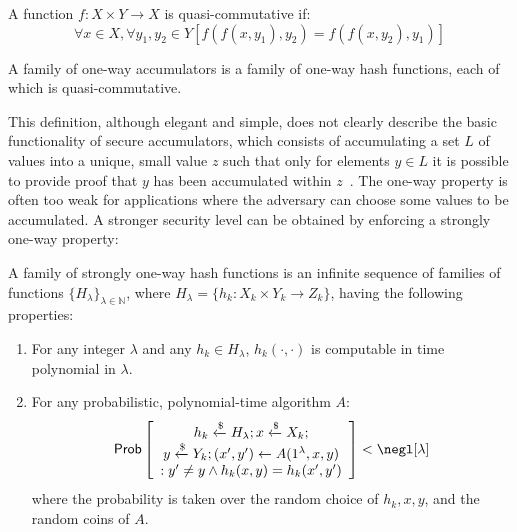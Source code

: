 \documentclass{iacrcc}
\begin{document}
\begin{definition}
A function \(f : X \times Y \to X\) is quasi-commutative if:
\[
\forall x \in X, \forall y_1, y_2 \in Y \left[ f(f(x, y_1), y_2) = f(f(x, y_2), y_1) \right]
\]    
\end{definition}

\begin{definition}
    A family of one-way accumulators is a family of one-way hash functions, each of which is quasi-commutative.    
\end{definition}

This definition, although elegant and simple, does not clearly describe the basic functionality of secure accumulators, which consists of accumulating a set \(L\) of values into a unique, small value \(z\) such that only for elements \(y \in L\) it is possible to provide proof that \(y\) has been accumulated within \(z\)~\cite{EC:BenDeM93}. The one-way property is often too weak for applications where the adversary can choose some values to be accumulated. A stronger security level can be obtained by enforcing a strongly one-way property:

\begin{definition}
    A family of strongly one-way hash functions is an infinite sequence of families of functions \(\{H_\lambda\}_{\lambda \in \mathbb{N}}\), where \(H_\lambda = \{h_k : X_k \times Y_k \to Z_k\}\), having the following properties:
\begin{enumerate}
    \item For any integer \(\lambda\) and any \(h_k \in H_\lambda\), \(h_k(\cdot, \cdot)\) is computable in time polynomial in \(\lambda\).
    \item For any probabilistic, polynomial-time algorithm \(A\):
    \[
    \Pr\left[
    \begin{array}{c}
            h_k \xleftarrow{\$} H_\lambda; x \xleftarrow{\$} X_k;\\
            y \xleftarrow{\$} Y_k; (x', y') \leftarrow A(1^\lambda, x, y)\\
            : y' \ne y \wedge h_k(x, y) = h_k(x', y') 
    \end{array}
    \right]
    < \negl[\lambda]
    \]
    where the probability is taken over the random choice of \(h_k, x, y\), and the random coins of \(A\).
\end{enumerate}
\end{definition}
\end{document}
